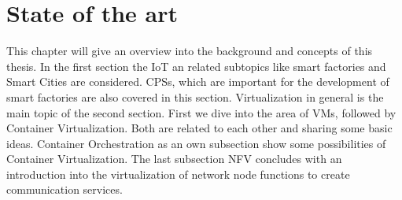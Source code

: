 


\acresetall

\chapter{State of the art}\label{chapter:state-of-the-art}
This chapter will give an overview into the background and concepts of this thesis.
In the first section the \ac{IoT} an related subtopics like smart factories and Smart Cities are considered.
\acp{CPS}, which are important for the development of smart factories are also covered in this section.
Virtualization in general is the main topic of the second section.
First we dive into the area of \acp{VM}, followed by Container Virtualization.
Both are related to each other and sharing some basic ideas.
Container Orchestration as an own subsection show some possibilities of Container Virtualization.
The last subsection \ac{NFV} concludes with an introduction into the virtualization of network node functions to create communication services.


